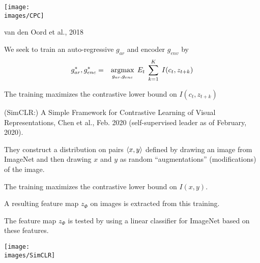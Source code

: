 {

{\huge

\centerline{\texttt{[image: \\images/CPC]}}

\centerline{van den Oord et al., 2018}

\vfill

We seek to train an auto-regressive $g_{ar}$ and encoder $g_{env}$ by
\begin{eqnarray*}
g_{ar}^*,g_{enc}^* & = & \operatorname*{argmax}_{g_{ar},g_{enc}}\;E_t  \;\sum_{k=1}^K \;I(c_t,z_{t+k})
\end{eqnarray*}
}

\vfill
The training maximizes the contrastive lower bound on $I(c_t,z_{t+k})$


(SimCLR:) A Simple Framework for Contrastive Learning of Visual Representations, Chen et al., Feb. 2020 (self-supervised leader as of February, 2020).

\vfill
They construct a distribution on pairs ${\mbox{$\langle x,y\rangle$}}$ defined by drawing an image from ImageNet and then drawing $x$ and $y$ as random ``augmentations'' (modifications) of the image.

\vfill
The training maximizes the contrastive lower bound on $I(x,y)$.


A resulting feature map $z_\Phi$ on images is extracted from this training.

\vfill
The feature map $z_\Phi$ is tested by using a {\color{red} linear} classifier for ImageNet based on these features.


\centerline{\texttt{[image: \\images/SimCLR]}}


}


